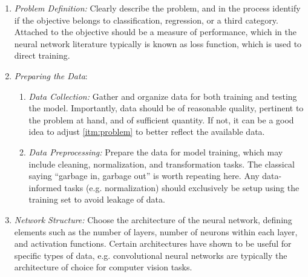 \begin{fullwidth}
\begin{multicols}{2}
\raggedcolumns
\begin{enumerate}
    \item \label{itm:problem}
        \textit{Problem Definition:} 
        Clearly describe the problem, 
        and in the process identify if the objective belongs to 
        classification, regression, or a third category.
        Attached to the objective should be a measure of performance, 
        which in the neural network literature typically is known as 
        loss function, which is used to direct training.

    \item \textit{Preparing the Data}:

        \begin{enumerate}
        \item \label{itm:data-collection}
            \textit{Data Collection:} 
            Gather and organize data for both training and testing the model.
            Importantly, data should be of reasonable quality,
            pertinent to the problem at hand, and of sufficient quantity.
            If not, it can be a good idea to adjust \cref{itm:problem} 
            to better reflect the available data.

        \item \label{itm:data-preprocessing}
            \textit{Data Preprocessing:} 
            Prepare the data for model training, 
            which may include cleaning, normalization, and transformation tasks.
            The classical saying \enquote{garbage in, garbage out}
            is worth repeating here.
            Any data-informed tasks (e.g. normalization) should exclusively
            be setup using the training set to avoid leakage of data.
            \unskip\footnotemark
        \end{enumerate}

    \item \label{itm:model-specification}
        \textit{Network Structure:} 
        Choose the architecture of the neural network, 
        defining elements such as the number of layers, 
        number of neurons within each layer, 
        and activation functions.
        Certain architectures have shown to be useful for specific 
        types of data, e.g. convolutional neural networks are
        typically the architecture of choice for computer vision tasks.%
        \unskip\footnotemark
        

\end{enumerate}
\end{multicols}
\end{fullwidth}

